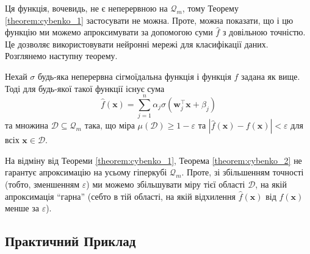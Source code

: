 Ця функція, вочевидь, не є неперервною на $\mathcal{Q}_m$, тому Теорему
\ref{theorem:cybenko_1} застосувати не можна. Проте, можна показати, що і цю
функцію ми можемо апроксимувати за допомогою суми $\widehat{f}$ з довільною
точністю. Це дозволяє використовувати нейронні мережі для класифікації даних.
Розглянемо наступну теорему.
\begin{theorem}\label{theorem:cybenko_2}
    Нехай $\sigma$ будь-яка неперервна сігмоїдальна функція і функція
    $f$ задана як вище. Тоді для будь-якої такої функції існує сума
    \begin{equation*}
        \widehat{f}(\mathbf{x}) = \sum_{j=1}^n \alpha_j \sigma(\boldsymbol{w}_j^{\top}\mathbf{x} + \beta_j)
    \end{equation*}
    та множина $\mathcal{D} \subseteq \mathcal{Q}_m$ така, що міра
    $\mu(\mathcal{D}) \geq 1-\varepsilon$ та $|\widehat{f}(\mathbf{x}) -
    f(\mathbf{x})| < \varepsilon$ для всіх $\mathbf{x} \in \mathcal{D}$.
\end{theorem}

На відміну від Теореми \ref{theorem:cybenko_1}, Теорема \ref{theorem:cybenko_2}
не гарантує апроксимацію на усьому гіперкубі $\mathcal{Q}_m$. Проте, зі
збільшенням точності (тобто, зменшенням $\varepsilon$) ми можемо збільшувати
міру тієї області $\mathcal{D}$, на якій апроксимація ``гарна'' (себто в тій
області, на якій відхилення $\widehat{f}(\mathbf{x})$ від $f(\mathbf{x})$ менше
за $\varepsilon$).

\subsection{Практичний Приклад}

